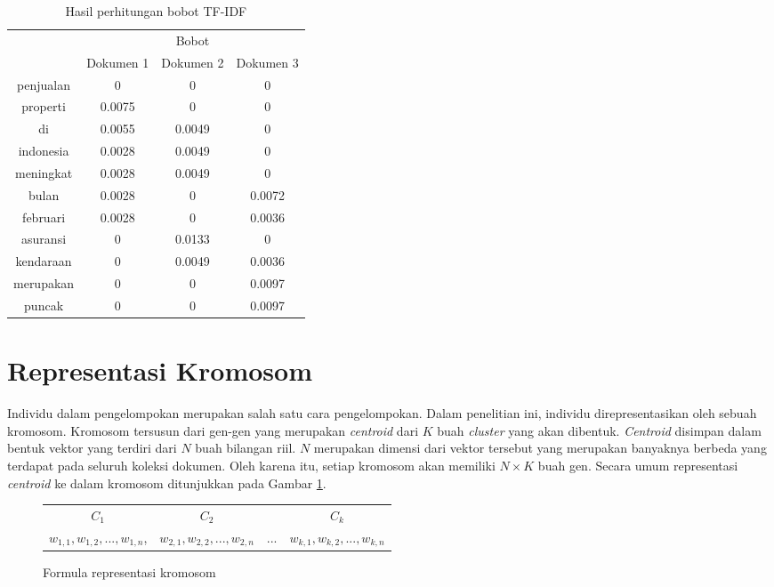 \begin{table}[H]
	\centering
	\caption{Hasil perhitungan bobot TF-IDF}
	\begin{tabular}{|c|c|c|c|} \hline
		\multirow{2}{*}{\Term} & \multicolumn{3}{c|}{Bobot} \\ \cline{2-4}
		& Dokumen 1 & Dokumen 2 & Dokumen 3 \\ \hline 
        penjualan & 0 & 0 & 0 \\ \hline
        properti & 0.0075 & 0 & 0 \\ \hline
        di & 0.0055 & 0.0049 & 0 \\ \hline
        indonesia & 0.0028 & 0.0049 & 0 \\ \hline
        meningkat & 0.0028 & 0.0049 & 0 \\ \hline
        bulan & 0.0028 & 0 & 0.0072 \\ \hline
        februari & 0.0028 & 0 & 0.0036 \\ \hline
        asuransi & 0 & 0.0133 & 0 \\ \hline
        kendaraan & 0 & 0.0049 & 0.0036 \\ \hline
        merupakan & 0 & 0 & 0.0097 \\ \hline
        puncak & 0 & 0 & 0.0097 \\ \hline
	\end{tabular}
	\label{tbl:tf-idf}
\end{table}

\section{Representasi Kromosom}
\label{sec:chromosome-rep}
Individu dalam pengelompokan merupakan salah satu cara pengelompokan. Dalam penelitian ini, individu direpresentasikan oleh sebuah kromosom. Kromosom tersusun dari gen-gen yang merupakan \textit{centroid} dari $K$ buah \textit{cluster} yang akan dibentuk. \textit{Centroid} disimpan dalam bentuk vektor yang terdiri dari $N$ buah bilangan riil. $N$ merupakan dimensi dari vektor tersebut yang merupakan banyaknya \term berbeda yang terdapat pada seluruh koleksi dokumen. Oleh karena itu, setiap kromosom akan memiliki $N\times K$ buah gen. Secara umum representasi \textit{centroid} ke dalam kromosom ditunjukkan pada Gambar \ref{fig:chromosome-rep}.

\begin{figure}[H]
	\centering
	\begin{tabular}{c c c c}
		$C_1$ & $C_2$ & & $C_k$ \\
		$w_{1,1}, w_{1,2}, ..., w_{1,n}$, & $w_{2,1}, w_{2,2}, ..., w_{2,n}$ & ... & $w_{k,1}, w_{k,2}, ..., w_{k,n}$
	\end{tabular}
	\caption{Formula representasi kromosom}
	\label{fig:chromosome-rep}
\end{figure}

